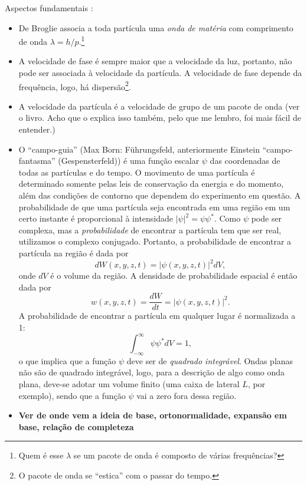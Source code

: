 Aspectos fundamentais \parencite{GreinerQM}:
\begin{itemize}
	\item De Broglie associa a toda partícula uma \emph{onda de matéria} com comprimento de onda $\lambda = h / p$.\footnote{Quem é esse $\lambda$ se um pacote de onda é composto de várias frequências?}
	\item A velocidade de fase é sempre maior que a velocidade da luz, portanto, não pode ser associada à velocidade da partícula. A velocidade de fase depende da frequência, logo, há dispersão\footnote{O pacote de onda se ``estica'' com o passar do tempo.}.
	\item A velocidade da partícula é a velocidade de grupo de um pacote de onda (ver o livro. Acho que o \parencite{Cohen} explica isso também, pelo que me lembro, foi mais fácil de entender.)
	\item O ``campo-guia'' (Max Born: Führungsfeld, anteriormente Einstein ``campo-fantasma'' (Gespensterfeld)) é uma função escalar $\psi$ das coordenadas de todas as partículas e do tempo. O movimento de uma partícula é determinado somente pelas leis de conservação da energia e do momento, além das condições de contorno que dependem do experimento em questão. A probabilidade de que uma partícula seja encontrada em uma região em um certo instante é proporcional à intensidade $|\psi|^2 = \psi\psi^*$. Como $\psi$ pode ser complexa, mas a \emph{probabilidade} de encontrar a partícula tem que ser real, utilizamos o complexo conjugado. Portanto, a probabilidade de encontrar a partícula na região é dada por
\begin{equation}
	dW(x, y, z, t) = |\psi(x, y, z, t)|^2 dV,
\end{equation}
%
onde $dV$ é o volume da região. A densidade de probabilidade espacial é então dada por
\begin{equation}
	w(x, y, z, t) = \frac{dW}{dt} = |\psi(x, y, z, t)|^2.
\end{equation}
%
A probabilidade de encontrar a partícula em qualquer lugar é normalizada a 1:
\begin{equation}
	\int_{-\infty}^\infty \psi\psi^* dV = 1,
\end{equation}
%
o que implica que a função $\psi$ deve ser de \emph{quadrado integrável}. Ondas planas não são de quadrado integrável, logo, para a descrição de algo como onda plana, deve-se adotar um volume finito (uma caixa de lateral $L$, por exemplo), sendo que a função $\psi$ vai a zero fora dessa região.
	\item \textbf{Ver de onde vem a ideia de base, ortonormalidade, expansão em base, relação de completeza}

\end{itemize}
